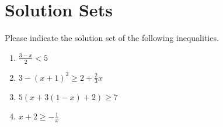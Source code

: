 \section{Solution Sets}
Please indicate the solution set of the following inequalities. 
\begin{enumerate}
	\item $\frac{3-x}{2} < 5$
	\item $3 - (x+1)^2 \geq 2 + \frac{2}{3}x$
	\item $5(x + 3(1-x)+2) \geq 7$
	\item $x+2 \geq -\frac{1}{x}$
\end{enumerate} 
